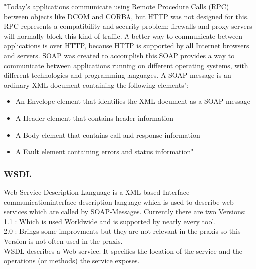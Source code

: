 \documentclass[12pt]{article}
\begin{document}
"Today's applications communicate using Remote Procedure Calls (RPC) between objects like DCOM and CORBA, but HTTP was not designed for this. RPC represents a compatibility and security problem; firewalls and proxy servers will normally block this kind of traffic. A better way to communicate between applications is over HTTP, because HTTP is supported by all Internet browsers and servers. SOAP was created to accomplish this.SOAP provides a way to communicate between applications running on different operating systems, with different technologies and programming languages. A SOAP message is an ordinary XML document containing the following elements":
\begin{itemize}
\item An Envelope element that identifies the XML document as a SOAP message
\item A Header element that contains header information
\item A Body element that contains call and response information
\item A Fault element containing errors and status information"
\end{itemize}
\cite{soap}

\subsubsection{WSDL}
Web Service Description Language is a XML based Interface communicationinterface description language
which is used to describe web services which are called by SOAP-Messages.
Currently there are two Versions:\\
1.1 : Which is used Worldwide and is supported by nearly every tool. \\
2.0 : Brings some improvments but they are not relevant in the praxis so this Version is not often
used in the praxis.\\
WSDL describes a Web service. It specifies the location of the service and the operations (or methods) the service exposes.\\
\cite{wsdl}
\end{document}
